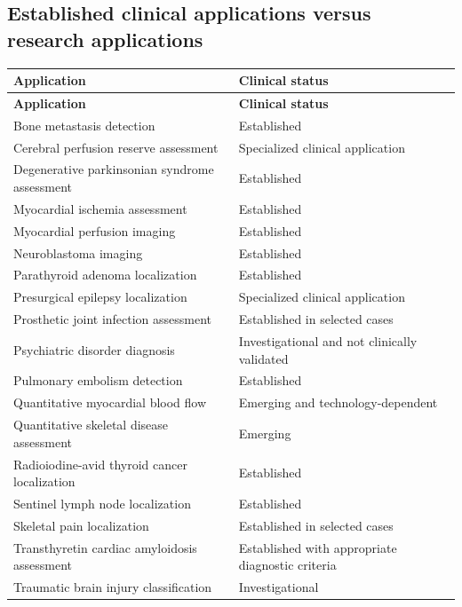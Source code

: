 \subsection{Established clinical applications versus research applications}
\begin{longtable}{@{}p{}p{}@{}}
\toprule
\textbf{Application} & \textbf{Clinical status} \\
\midrule
\endfirsthead
\toprule
\textbf{Application} & \textbf{Clinical status} \\
\midrule
\endhead
Bone metastasis detection & Established \\
Cerebral perfusion reserve assessment & Specialized clinical application \\
Degenerative parkinsonian syndrome assessment & Established \\
Myocardial ischemia assessment & Established \\
Myocardial perfusion imaging & Established \\
Neuroblastoma imaging & Established \\
Parathyroid adenoma localization & Established \\
Presurgical epilepsy localization & Specialized clinical application \\
Prosthetic joint infection assessment & Established in selected cases \\
Psychiatric disorder diagnosis & Investigational and not clinically validated \\
Pulmonary embolism detection & Established \\
Quantitative myocardial blood flow & Emerging and technology-dependent \\
Quantitative skeletal disease assessment & Emerging \\
Radioiodine-avid thyroid cancer localization & Established \\
Sentinel lymph node localization & Established \\
Skeletal pain localization & Established in selected cases \\
Transthyretin cardiac amyloidosis assessment & Established with appropriate diagnostic criteria \\
Traumatic brain injury classification & Investigational \\
\bottomrule
\end{longtable}

